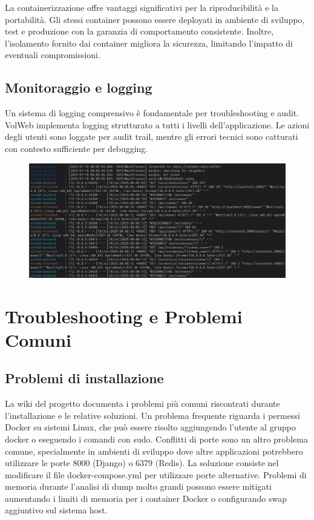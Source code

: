 La containerizzazione offre vantaggi significativi per la riproducibilità e la portabilità. Gli stessi container possono essere deployati in ambiente di sviluppo, test e produzione con la garanzia di comportamento consistente. Inoltre, l'isolamento fornito dai container migliora la sicurezza, limitando l'impatto di eventuali compromissioni.

\subsection{Monitoraggio e logging}
Un sistema di logging comprensivo è fondamentale per troubleshooting e audit. VolWeb implementa logging strutturato a tutti i livelli dell'applicazione. Le azioni degli utenti sono loggate per audit trail, mentre gli errori tecnici sono catturati con contesto sufficiente per debugging. 
\begin{figure}[H]
\centering
\includegraphics[width=1\linewidth]{images/volweb-original/volweb-logs.png}
\end{figure}

\section{Troubleshooting e Problemi Comuni}
\subsection{Problemi di installazione}
La wiki del progetto documenta i problemi più comuni riscontrati durante l'installazione e le relative soluzioni. Un problema frequente riguarda i permessi Docker su sistemi Linux, che può essere risolto aggiungendo l'utente al gruppo docker o eseguendo i comandi con sudo.
Conflitti di porte sono un altro problema comune, specialmente in ambienti di sviluppo dove altre applicazioni potrebbero utilizzare le porte 8000 (Django) o 6379 (Redis). La soluzione consiste nel modificare il file docker-compose.yml per utilizzare porte alternative.
Problemi di memoria durante l'analisi di dump molto grandi possono essere mitigati aumentando i limiti di memoria per i container Docker o configurando swap aggiuntivo sul sistema host.

